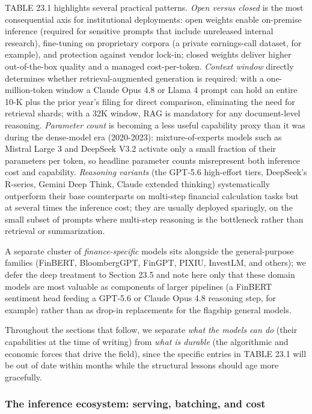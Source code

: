 TABLE 23.1 highlights several practical patterns. \textit{Open versus closed} is the most consequential axis for institutional deployments: open weights enable on-premise inference (required for sensitive prompts that include unreleased internal research), fine-tuning on proprietary corpora (a private earnings-call dataset, for example), and protection against vendor lock-in; closed weights deliver higher out-of-the-box quality and a managed cost-per-token. \textit{Context window} directly determines whether retrieval-augmented generation \citep{lewis2020retrieval} is required: with a one-million-token window a Claude Opus 4.8 or Llama 4 prompt can hold an entire 10-K plus the prior year's filing for direct comparison, eliminating the need for retrieval shards; with a 32K window, RAG is mandatory for any document-level reasoning. \textit{Parameter count} is becoming a less useful capability proxy than it was during the dense-model era (2020-2023): mixture-of-experts models such as Mistral Large 3 and DeepSeek V3.2 activate only a small fraction of their parameters per token, so headline parameter counts misrepresent both inference cost and capability. \textit{Reasoning variants} (the GPT-5.6 high-effort tiers, DeepSeek's R-series, Gemini Deep Think, Claude extended thinking) systematically outperform their base counterparts on multi-step financial calculation tasks but at several times the inference cost; they are usually deployed sparingly, on the small subset of prompts where multi-step reasoning is the bottleneck rather than retrieval or summarization.

A separate cluster of \textit{finance-specific} models sits alongside the general-purpose families (FinBERT, BloombergGPT, FinGPT, PIXIU, InvestLM, and others); we defer the deep treatment to Section 23.5 and note here only that these domain models are most valuable as components of larger pipelines (a FinBERT sentiment head feeding a GPT-5.6 or Claude Opus 4.8 reasoning step, for example) rather than as drop-in replacements for the flagship general models.

Throughout the sections that follow, we separate \textit{what the models can do} (their capabilities at the time of writing) from \textit{what is durable} (the algorithmic and economic forces that drive the field), since the specific entries in TABLE 23.1 will be out of date within months while the structural lessons should age more gracefully.

\subsubsection{The inference ecosystem: serving, batching, and cost}

